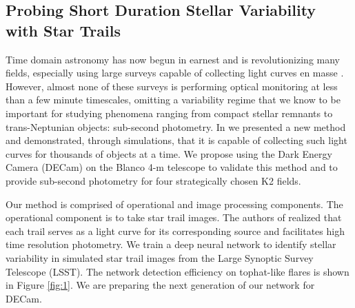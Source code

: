 \documentclass[11pt]{article}
\begin{document}

\subsection*{Probing Short Duration Stellar Variability with Star Trails}


Time domain astronomy has now begun in earnest and is revolutionizing many fields, especially using large surveys capable of collecting light curves en masse \citep{2012IAUS..285..141D}. However, almost none of these surveys is performing optical monitoring at less than a few minute timescales, omitting a variability regime that we know to be important for studying phenomena ranging from compact stellar remnants to trans-Neptunian objects: sub-second photometry. In \citealt{2018arXiv180806977T} we presented a new method and demonstrated, through simulations, that it is capable of collecting such light curves for thousands of objects at a time. We propose using the Dark Energy Camera (DECam) on the Blanco 4-m telescope to validate this method and to provide sub-second photometry for four strategically chosen K2 fields.



Our method is comprised of operational and image processing components. The operational component is to take star trail images. The authors of \citealt{1986PASP...98..802H} realized that each trail serves as a light curve for its corresponding source and facilitates high time resolution photometry. We train a deep neural network to identify stellar variability in simulated star trail images from the Large Synoptic Survey Telescope (LSST). The network detection efficiency on tophat-like flares is shown in Figure \ref{fig:1}. We are preparing the next generation of our network for DECam. 
\end{document}
